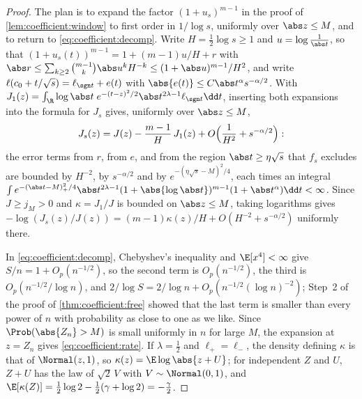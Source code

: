 \begin{refsection}

\begin{proof}
The plan is to expand the factor $(1+u_s)^{m-1}$ in the proof of \cref{lem:coefficient:window} to first order in $1/\log s$, uniformly over $\abs z\le M$, and to return to \eqref{eq:coefficient:decomp}. Write $H=\frac12\log s\ge1$ and $u=\log\frac1{\abs t}$, so that $(1+u_s(t))^{m-1}=1+(m-1)u/H+r$ with $\abs r\le\sum_{k\ge2}\binom{m-1}k\abs u^kH^{-k}\le(1+\abs u)^{m-1}/H^2$, and write $\ell(c_0+t/\sqrt s)=\ell_{\sgn t}+e(t)$ with $\abs{e(t)}\le C\abs t^\alpha s^{-\alpha/2}$. With $J_1(z)=\int_\R\log\abs t\;e^{-(t-z)^2/2}\abs t^{2\lambda-1}\ell_{\sgn t}\dd t$, inserting both expansions into the formula for $J_s$ gives, uniformly over $\abs z\le M$,
\[
J_s(z)=J(z)-\frac{m-1}H\,J_1(z)+O\Bigl(\frac1{H^2}+s^{-\alpha/2}\Bigr):
\]
the error terms from $r$, from $e$, and from the region $\abs t\ge\eta\sqrt s$ that $f_s$ excludes are bounded by $H^{-2}$, by $s^{-\alpha/2}$ and by $e^{-(\eta\sqrt s-M)^2/4}$, each times an integral $\int e^{-(\abs t-M)_+^2/4}\abs t^{2\lambda-1}(1+\abs{\log\abs t})^{m-1}(1+\abs t^\alpha)\dd t<\infty$. Since $J\ge j_M>0$ and $\kappa=J_1/J$ is bounded on $\abs z\le M$, taking logarithms gives $-\log(J_s(z)/J(z))=(m-1)\kappa(z)/H+O(H^{-2}+s^{-\alpha/2})$ uniformly there.

In \eqref{eq:coefficient:decomp}, Chebyshev's inequality and $\E[x^4]<\infty$ give $S/n=1+O_p(n^{-1/2})$, so the second term is $O_p(n^{-1/2})$, the third is $O_p(n^{-1/2}/\log n)$, and $2/\log S=2/\log n+O_p(n^{-1/2}(\log n)^{-2})$; Step~2 of the proof of \cref{thm:coefficient:free} showed that the last term is smaller than every power of $n$ with probability as close to one as we like. Since $\Prob(\abs{Z_n}>M)$ is small uniformly in $n$ for large $M$, the expansion at $z=Z_n$ gives \eqref{eq:coefficient:rate}. If $\lambda=\frac12$ and $\ell_+=\ell_-$, the density defining $\kappa$ is that of $\Normal(z,1)$, so $\kappa(z)=\E\log\abs{z+U}$; for independent $Z$ and $U$, $Z+U$ has the law of $\sqrt2\,V$ with $V\sim\Normal(0,1)$, and $\E[\kappa(Z)]=\frac12\log2-\frac12(\gamma+\log2)=-\frac\gamma2$.
\end{proof}


\end{refsection}
